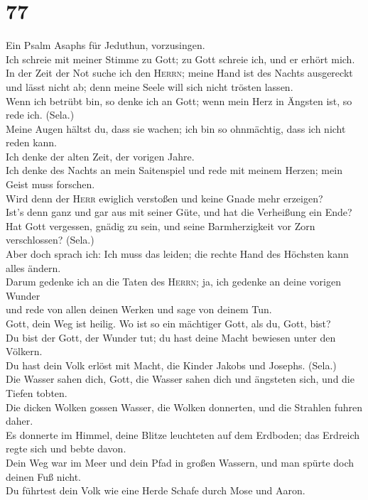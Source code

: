 \hypertarget{section-76}{%
\section{77}\label{section-76}}

 Ein Psalm Asaphs für Jeduthun, vorzusingen.\\
 Ich schreie mit meiner Stimme zu Gott; zu Gott schreie
ich, und er erhört mich.\\
 In der Zeit der Not suche ich den \textsc{Herrn}; meine
Hand ist des Nachts ausgereckt und lässt nicht ab; denn meine Seele will
sich nicht trösten lassen.\\
 Wenn ich betrübt bin, so denke ich an Gott; wenn mein
Herz in Ängsten ist, so rede ich. (Sela.)\\
 Meine Augen hältst du, dass sie wachen; ich bin so
ohnmächtig, dass ich nicht reden kann.\\
 Ich denke der alten Zeit, der vorigen Jahre.\\
 Ich denke des Nachts an mein Saitenspiel und rede mit
meinem Herzen; mein Geist muss forschen.\\
 Wird denn der \textsc{Herr} ewiglich verstoßen und keine
Gnade mehr erzeigen?\\
 Ist's denn ganz und gar aus mit seiner Güte, und hat die
Verheißung ein Ende?\\
 Hat Gott vergessen, gnädig zu sein, und seine
Barmherzigkeit vor Zorn verschlossen? (Sela.)\\
 Aber doch sprach ich: Ich muss das leiden; die rechte
Hand des Höchsten kann alles ändern.\\
 Darum gedenke ich an die Taten des \textsc{Herrn}; ja,
ich gedenke an deine vorigen Wunder\\
 und rede von allen deinen Werken und sage von deinem
Tun.\\
 Gott, dein Weg ist heilig. Wo ist so ein mächtiger Gott,
als du, Gott, bist?\\
 Du bist der Gott, der Wunder tut; du hast deine Macht
bewiesen unter den Völkern.\\
 Du hast dein Volk erlöst mit Macht, die Kinder Jakobs
und Josephs. (Sela.)\\
 Die Wasser sahen dich, Gott, die Wasser sahen dich und
ängsteten sich, und die Tiefen tobten.\\
 Die dicken Wolken gossen Wasser, die Wolken donnerten,
und die Strahlen fuhren daher.\\
 Es donnerte im Himmel, deine Blitze leuchteten auf dem
Erdboden; das Erdreich regte sich und bebte davon.\\
 Dein Weg war im Meer und dein Pfad in großen Wassern,
und man spürte doch deinen Fuß nicht.\\
 Du führtest dein Volk wie eine Herde Schafe durch Mose
und Aaron.

